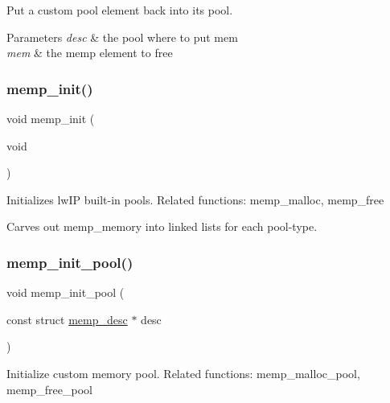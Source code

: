 Put a custom pool element back into its pool.


\begin{DoxyParams}{Parameters}
{\em desc} & the pool where to put mem \\
\hline
{\em mem} & the memp element to free \\
\hline
\end{DoxyParams}
\mbox{\label{openmote-cc2538_2lwip_2src_2core_2memp_8c_a9693e5b1ac2c6b9c0e7870522d45efa2}} 
\subsubsection{\texorpdfstring{memp\+\_\+init()}{memp\_init()}}
{\footnotesize\ttfamily void memp\+\_\+init (\begin{DoxyParamCaption}\item[{void}]{ }\end{DoxyParamCaption})}

Initializes lw\+IP built-\/in pools. Related functions\+: memp\+\_\+malloc, memp\+\_\+free

Carves out memp\+\_\+memory into linked lists for each pool-\/type. \mbox{\label{openmote-cc2538_2lwip_2src_2core_2memp_8c_a6416303426d05526bed33f241fa6ecd7}} 
\subsubsection{\texorpdfstring{memp\+\_\+init\+\_\+pool()}{memp\_init\_pool()}}
{\footnotesize\ttfamily void memp\+\_\+init\+\_\+pool (\begin{DoxyParamCaption}\item[{const struct \hyperlink{structmemp__desc}{memp\+\_\+desc} $\ast$}]{desc }\end{DoxyParamCaption})}

Initialize custom memory pool. Related functions\+: memp\+\_\+malloc\+\_\+pool, memp\+\_\+free\+\_\+pool


